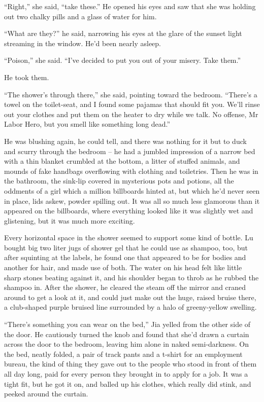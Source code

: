 ``Right,'' she said, ``take these.'' He opened his eyes and saw that
she was holding out two chalky pills and a glass of water for him.

``What are they?'' he said, narrowing his eyes at the glare of the
sunset light streaming in the window. He'd been nearly asleep.

``Poison,'' she said. ``I've decided to put you out of your misery.
Take them.''

He took them.

``The shower's through there,'' she said, pointing toward the
bedroom. ``There's a towel on the toilet-seat, and I found some
pajamas that should fit you. We'll rinse out your clothes and put
them on the heater to dry while we talk. No offense, Mr Labor Hero,
but you smell like something long dead.''

He was blushing again, he could tell, and there was nothing for it
but to duck and scurry through the bedroom -- he had a jumbled
impression of a narrow bed with a thin blanket crumbled at the
bottom, a litter of stuffed animals, and mounds of fake handbags
overflowing with clothing and toiletries. Then he was in the
bathroom, the sink-lip covered in mysterious pots and potions, all
the oddments of a girl which a million billboards hinted at, but
which he'd never seen in place, lids askew, powder spilling out. It
was all so much less glamorous than it appeared on the billboards,
where everything looked like it was slightly wet and glistening,
but it was much more exciting.

Every horizontal space in the shower seemed to support some kind of
bottle. Lu bought big two liter jugs of shower gel that he could
use as shampoo, too, but after squinting at the labels, he found
one that appeared to be for bodies and another for hair, and made
use of both. The water on his head felt like little sharp stones
beating against it, and his shoulder began to throb as he rubbed
the shampoo in. After the shower, he cleared the steam off the
mirror and craned around to get a look at it, and could just make
out the huge, raised bruise there, a club-shaped purple bruised
line surrounded by a halo of greeny-yellow swelling.

``There's something you can wear on the bed,'' Jia yelled from the
other side of the door. He cautiously turned the knob and found
that she'd drawn a curtain across the door to the bedroom, leaving
him alone in naked semi-darkness. On the bed, neatly folded, a pair
of track pants and a t-shirt for an employment bureau, the kind of
thing they gave out to the people who stood in front of them all
day long, paid for every person they brought in to apply for a job.
It was a tight fit, but he got it on, and balled up his clothes,
which really did stink, and peeked around the curtain.

